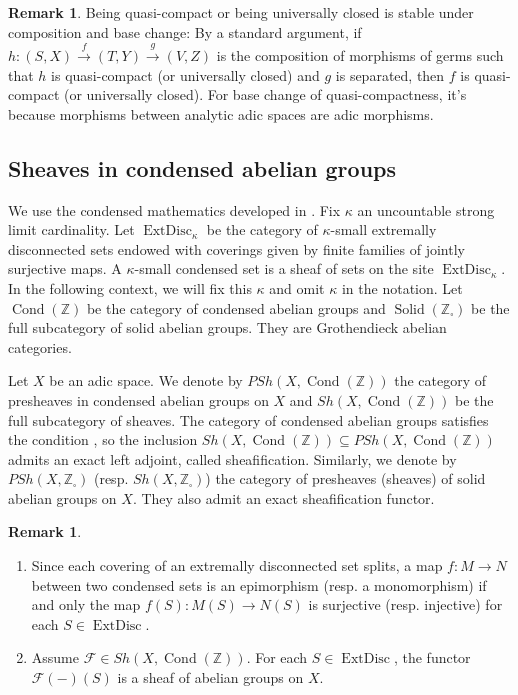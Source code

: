 \documentclass{article}
\theoremstyle{definition}
\newtheorem{remark}[theorem]{Remark}
\def\sF{{\mathscr{F}}}
\def\bZ{{\mathbb Z}}
\DeclareMathOperator{\solid}{Solid}
\DeclareMathOperator{\cond}{Cond}
\DeclareMathOperator{\ExtDisc}{ExtDisc}
\begin{document}
\begin{remark}\label{remarkunivclosed}
	Being quasi-compact or being universally closed is stable under composition and base change: By a standard argument, if $h:(S,X)\stackrel{f}\to (T,Y)\stackrel{g}\to (V,Z)$ is the composition of morphisms of germs such that $h$ is quasi-compact (or universally closed) and $g$ is separated, then $f$ is quasi-compact (or universally closed). For base change of quasi-compactness, it's because morphisms between analytic adic spaces are adic morphisms.
\end{remark}

\subsection{Sheaves in condensed abelian groups}
We use the condensed mathematics developed in \cite{scholze2019condensed}. Fix $\kappa$ an uncountable strong limit cardinality. Let $\ExtDisc_{\kappa}$ be the category of $\kappa$-small extremally disconnected sets endowed with coverings given by finite families of jointly surjective maps. A $\kappa$-small condensed set is a sheaf of sets on the site $\ExtDisc_{\kappa}$. In the following context, we will fix this $\kappa$ and omit $\kappa$ in the notation. Let $\cond(\bZ)$ be the category of condensed abelian groups and $\solid(\bZ_\square)$ be the full subcategory of solid abelian groups. They are Grothendieck abelian categories.

Let $X$ be an adic space. We denote by $\mathit{PSh}(X,\cond(\bZ))$ the category of presheaves in condensed abelian groups on $X$ and $\mathit{Sh}(X,\cond(\bZ))$ be the full subcategory of sheaves. The category of condensed abelian groups satisfies the condition  \cite[(17.4.1)]{kashiwara2006categories}, so the inclusion $\mathit{Sh}(X,\cond(\bZ))\subseteq \mathit{PSh}(X,\cond(\bZ))$ admits an exact left adjoint, called sheafification. Similarly, we denote by $\mathit{PSh}(X,\bZ_\square)$ (resp. $\mathit{Sh}(X,\bZ_\square)$) the category of presheaves (sheaves) of solid abelian groups on $X$. They also admit an exact sheafification functor.

\begin{remark}\label{smallremarks}
\begin{enumerate}
	\item  Since each covering of an extremally disconnected set splits, a map $f:M\to N$ between two condensed sets is an epimorphism (resp. a monomorphism)  if and only the map $f(S): M(S)\to N(S)$ is surjective (resp. injective) for each $S\in \ExtDisc$.
	\item Assume $\sF\in \mathit{Sh}(X,\cond(\bZ))$. For each $S\in \ExtDisc$, the functor $\sF(-)(S)$ is a sheaf of abelian groups on $X$.	
\end{enumerate}
\end{remark}
\end{document}
